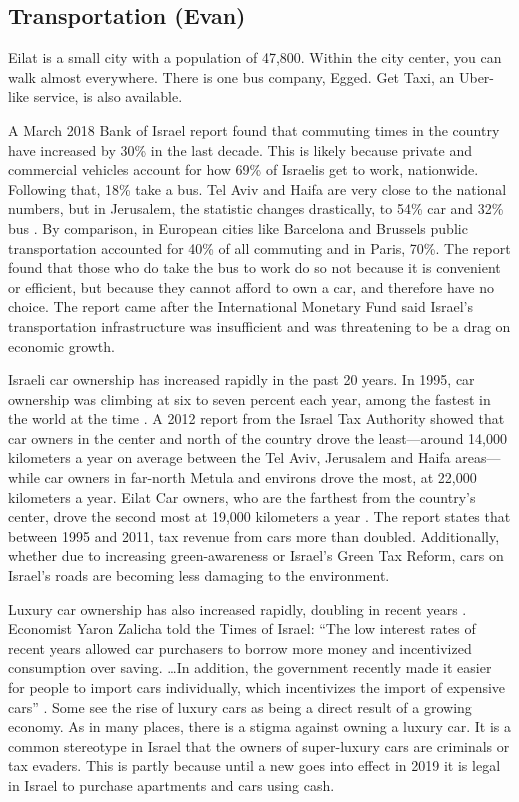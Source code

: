 \documentclass{article}                         %
\begin{document}
\subsection{Transportation (Evan)}
Eilat is a small city with a population of 47,800. Within the city center, you can walk almost everywhere. There is one bus company, Egged. \cite{TransportationEilat} Get Taxi, an Uber-like service, is also available. 

A March 2018 Bank of Israel report found that commuting times in the country have increased by 30\% in the last decade. This is likely because private and commercial vehicles account for how 69\% of Israelis get to work, nationwide. Following that, 18\% take a bus. Tel Aviv and Haifa are very close to the national numbers, but in Jerusalem, the statistic changes drastically, to 54\% car and 32\% bus \cite{Dori2018IsraeliRoads}. By comparison, in European cities like Barcelona and Brussels public transportation accounted for 40\% of all commuting and in Paris, 70\%. The report found that those who do take the bus to work do so not because it is convenient or efficient, but because they cannot afford to own a car, and therefore have no choice. The report came after the International Monetary Fund said Israel’s transportation infrastructure was insufficient and was threatening to be a drag on economic growth. 

Israeli car ownership has increased rapidly in the past 20 years. In 1995, car ownership was climbing at six to seven percent each year, among the fastest in the world at the time \cite{Slater1995IsraelCulture}. A 2012 report from the Israel Tax Authority showed that car owners in the center and north of the country drove the least—around 14,000 kilometers a year on average between the Tel Aviv, Jerusalem and Haifa areas—while car owners in far-north Metula and environs drove the most, at 22,000 kilometers a year. Eilat Car owners, who are the farthest from the country’s center, drove the second most at 19,000 kilometers a year \cite{Schmil2012WhatHow}. The report states that between 1995 and 2011, tax revenue from cars more than doubled. Additionally, whether due to increasing green-awareness or Israel’s Green Tax Reform, cars on Israel's roads are becoming less damaging to the environment\cite{Schmil2012WhatHow}.

Luxury car ownership has also increased rapidly, doubling in recent years \cite{Weinglass2018Rev-upIsrael}. Economist Yaron Zalicha told the Times of Israel: “The low interest rates of recent years allowed car purchasers to borrow more money and incentivized consumption over saving. …In addition, the government recently made it easier for people to import cars individually, which incentivizes the import of expensive cars” \cite{Weinglass2018Rev-upIsrael}. Some see the rise of luxury cars as being a direct result of a growing economy. As in many places, there is a stigma against owning a luxury car. It is a common stereotype in Israel that the owners of super-luxury cars are criminals or tax evaders. This is partly because until a new goes into effect in 2019 it is legal in Israel to purchase apartments and cars using cash.
\end{document}
